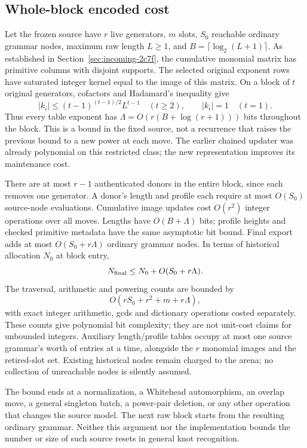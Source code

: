 \subsection{Whole-block encoded cost}

Let the frozen source have $r$ live generators, $m$ slots, $S_0$ reachable
ordinary grammar nodes, maximum raw length $L\ge1$, and
$B=\lceil\log_2(L+1)\rceil$. As established in
Section~\ref{sec:incoming-2c7f}, the cumulative monomial matrix has primitive
columns with disjoint supports. The selected original exponent rows have
saturated integer kernel equal to the image of this matrix. On a block of
$t$ original generators, cofactors and Hadamard's inequality give
\[
 |k_i|\le(t-1)^{(t-1)/2}L^{t-1}\quad(t\ge2),
 \qquad |k_i|=1\quad(t=1).
\]
Thus every table exponent has
$\Lambda=O(r(B+\log(r+1)))$ bits throughout the block. This is a bound in
the fixed source, not a recurrence that raises the previous bound to a new
power at each move. The earlier chained updater was already polynomial on
this restricted class; the new representation improves its maintenance cost.

There are at most $r-1$ authenticated donors in the entire block, since each
removes one generator. A donor's length and profile each require at most
$O(S_0)$ source-node evaluations. Cumulative image updates cost $O(r^2)$
integer operations over all moves. Lengths have $O(B+\Lambda)$ bits; profile
heights and checked primitive metadata have the same asymptotic bit bound.
Final export adds at most $O(S_0+r\Lambda)$ ordinary grammar nodes. In terms
of historical allocation $N_0$ at block entry,
\[
 N_{\rm final}\le N_0+O(S_0+r\Lambda).
\]
The traversal, arithmetic and powering counts are bounded by
\[
 O(rS_0+r^2+m+r\Lambda),
\]
with exact integer arithmetic, gcds and dictionary operations costed separately.
These counts give polynomial bit complexity; they are not unit-cost claims
for unbounded integers. Auxiliary length/profile tables occupy at most one
source grammar's worth of entries at a time, alongside the $r$ monomial
images and the retired-slot set. Existing historical nodes remain charged
to the arena; no collection of unreachable nodes is silently assumed.

The bound ends at a normalization, a Whitehead automorphism, an overlap move,
a general singleton batch, a power-pair deletion, or any other operation that
changes the source model. The next raw block starts from the resulting
ordinary grammar. Neither this argument nor the implementation bounds the
number or size of such source resets in general knot recognition.

